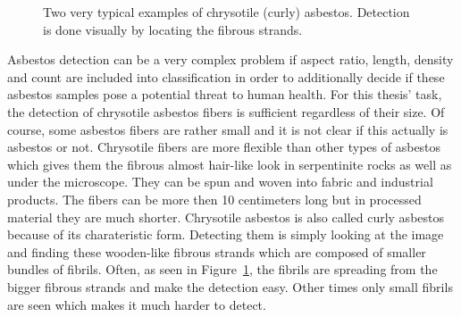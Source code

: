 \begin{figure}[h]
\centering
\caption{Two very typical examples of chrysotile (curly) asbestos. Detection is done visually by locating the fibrous strands.}
\label{fig:chrysotile_classification}
\end{figure}

\quad

Asbestos detection can be a very complex problem if  aspect ratio, length, density and count are included into classification in order to additionally decide if these asbestos samples pose a potential threat to human health. For this thesis' task, the detection of chrysotile asbestos fibers is sufficient regardless of their size. Of course, some asbestos fibers are rather small and it is not clear if this actually is asbestos or not. Chrysotile fibers are more flexible than other types of asbestos which gives them the fibrous almost hair-like look in serpentinite rocks as well as under the microscope. They can be spun and woven into fabric and industrial products. The fibers can be more then 10 centimeters  long but in processed material they are much shorter. Chrysotile asbestos is also called curly asbestos because of its charateristic form. Detecting  them is simply looking at the image and finding these wooden-like fibrous strands which are composed of smaller bundles of fibrils. Often, as  seen in Figure~\ref{fig:chrysotile_classification}, the fibrils are spreading  from the bigger fibrous strands and make the detection easy. Other times only small fibrils are seen which makes it much harder to detect.


